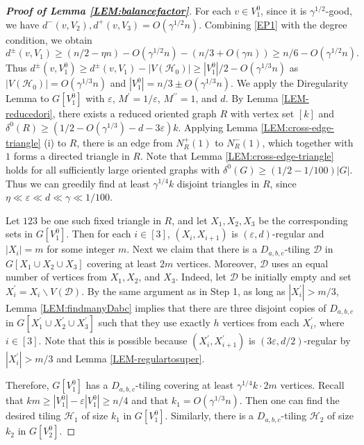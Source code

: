 \documentclass[11pt,a4paper,reqno]{amsart}
\theoremstyle{definition} %
\begin{document}
\begin{proof}[\textbf{Proof of Lemma \ref{LEM:balancefactor}}]
For each $v\in V_1^0$, since it is $\gamma^{1/2}$-good, we have $d^-(v,V_2), d^+(v,V_3)=O(\gamma^{1/2} n)$. Combining \ref{EP1} with the degree condition, we obtain
$$
d^\pm(v,V_1)\geqslant (n/2-\eta n)- O(\gamma^{1/2}n)-(n/3+O(\gamma n))\geqslant n/6-O(\gamma^{1/2}n).
$$
Thus $d^\pm(v,V^0_1)\geqslant d^\pm(v,V_1)-|V(\mathcal{H}_0)|
\geqslant |V^0_1|/2-O(\gamma ^{1/3}n)$ as $|V(\mathcal{H}_0)|=O(\gamma^{1/3}n)$ and $|V_1^0|=n/3\pm O(\gamma^{1/3}n)$. We apply the Diregularity Lemma to $G[V^0_1]$ with $\varepsilon$, $M^\prime = 1/\varepsilon$, $M^{\prime\prime}=1$, and $d$. By Lemma \ref{LEM-reducedori}, there exists a reduced oriented graph $R$ with vertex set $[k]$ and
$
\delta^0(R)\geqslant (1/2-O(\gamma^{1/3})-d-3\varepsilon)k.
$
Applying Lemma \ref{LEM:cross-edge-triangle} (i) to $R$, there is an edge from $N^+_R(1)$ to $N^-_R(1)$, which together with $1$ forms a directed triangle in $R$. Note that Lemma \ref{LEM:cross-edge-triangle} holds for all sufficiently large oriented graphs with $\delta^0(G)\geqslant (1/2-1/100)|G|$. Thus we can greedily find at least $\gamma^{1/4}k$ disjoint triangles in $R$, since $\eta \ll \varepsilon \ll d\ll \gamma \ll 1/100$.

Let $123$ be one such fixed triangle in $R$, and let $X_1,X_2,X_3$ be the corresponding sets in $G[V_1^0]$. Then for each $i\in[3]$, $(X_i, X_{i+1})$ is $(\varepsilon, d)$-regular and $|X_i|=m$ for some integer $m$. Next we claim that there is a $D_{a,b,c}$-tiling $\mathcal{D}$ in $G[X_1\cup X_2\cup X_3]$ covering at least $2m$ vertices. Moreover, $\mathcal{D}$ uses an equal number of vertices from $X_1,X_2$, and $X_3$. Indeed, let $\mathcal{D}$ be initially empty and set $X_i^{\prime}=X_i\backslash V(\mathcal{D})$. By the same argument as in Step 1, as long as $|X_i^{\prime}|> m/3$, Lemma \ref{LEM:findmanyDabc} implies that there are three disjoint copies of $D_{a, b, c}$ in $G[X^\prime_1\cup X^\prime_2\cup X^\prime_3]$ such that they use exactly $h$ vertices from each $X_i^{\prime}$, where $i\in[3]$. Note that this is possible because $(X^\prime_i, X^\prime_{i+1})$ is $(3\varepsilon,d/2)$-regular by $|X_i^{\prime}|> m/3$ and Lemma \ref{LEM-regulartosuper}.

Therefore, $G[V_1^0]$ has a $D_{a,b,c}$-tiling covering at least $\gamma^{1/4}k\cdot 2m$ vertices. Recall that $km\geqslant |V_1^0|-\varepsilon |V_1^0|\geqslant n/4$ and that $k_1 = O(\gamma^{1/3} n)$. Then one can find the desired tiling $\mathcal{H}_1$ of size $k_1$ in $G[V_1^0]$. Similarly, there is a $D_{a,b,c}$-tiling $\mathcal{H}_2$ of size $k_2$ in $G[V_2^0]$.


\end{proof}
\end{document}
